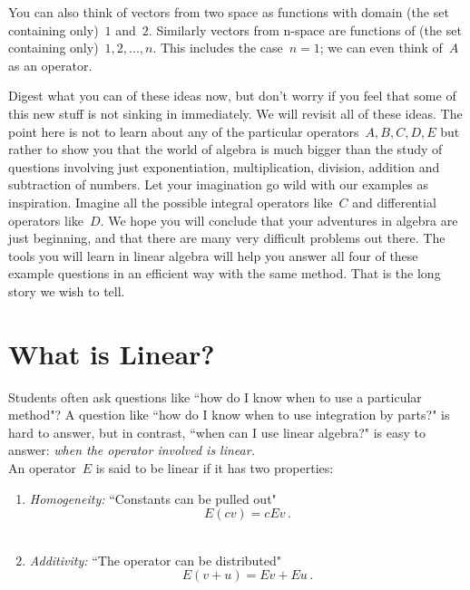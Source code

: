 You can also think of vectors from two space as functions with domain (the set containing only)~$1$ and~$2$. Similarly vectors from n-space are functions of (the set containing only)~$1,2,...,n$. This includes the case~$n=1$; we can even think of~$A$ as an operator. 




Digest what you can of these ideas now, but don't worry if you feel that some of this new stuff is not sinking in immediately. We will revisit all of these ideas. The point here is not to learn about any of the particular operators~$A,B,C,D,E$ but rather to show you that the world of algebra is much bigger than the study of questions involving just exponentiation, multiplication, division, addition and subtraction of numbers. Let your imagination go wild with our examples as inspiration. Imagine all the possible integral operators like~$C$ and differential operators like~$D$. We hope you will conclude that your adventures in algebra are just beginning, and that there are many very difficult problems out there. 
The tools you will learn in linear algebra will help you answer all four of these example questions in an efficient way with the same method. That is the long story we wish to tell. 





\section{What is Linear?} 


Students often ask questions like ``how do I know when to use a particular method"? A question like ``how do I know when to use integration by parts?" is hard to  answer, but in contrast, ``when can I use  linear algebra?" is easy to answer: %
{\itshape when the operator involved is linear.} \\

\noindent
An operator~$E$ is \hypertarget{asked in chapter 1}{said to be linear} if it has two properties:\\[-.5cm]
\begin{enumerate}
\item {\itshape Homogeneity:} ``Constants can be pulled out"
\[E(cv)=cEv\, .\] \\[-.5cm]
\item {\itshape Additivity:} ``The operator can be distributed"
\[E(v+u)=Ev+Eu\, .\] 
\end{enumerate}




